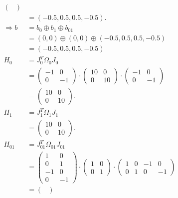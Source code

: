 \begin{align}
\begin{pmatrix}
    \end{pmatrix}\\
    &= (-0.5, 0.5, 0.5, -0.5).\\
    \Rightarrow b &= b_0 \oplus b_1 \oplus b_{01}\\
    &= (0,0) \oplus (0,0) \oplus (-0.5, 0.5, 0.5, -0.5)\\
    &= (-0.5, 0.5, 0.5, -0.5)\\
    H_0 &= J_{0}^T \Omega_0 J_{0}\\
    &= \begin{pmatrix}
           -1 & 0 \\ 0 & -1
    \end{pmatrix} \cdotp \begin{pmatrix}
                             10 & 0 \\ 0 & 10
    \end{pmatrix} \cdotp \begin{pmatrix}
                             -1 & 0 \\ 0 & -1
    \end{pmatrix}\\
    &= \begin{pmatrix}
           10 & 0 \\ 0 & 10
    \end{pmatrix}.\\
    H_1 &= J_{1}^T \Omega_1 J_{1}\\
    &= \begin{pmatrix}
           10 & 0 \\ 0 & 10
    \end{pmatrix}.\\
    H_{01} &= J_{01}^T \Omega_{01} J_{01}\\
    &= \begin{pmatrix}
           1 & 0 \\ 0 & 1 \\ -1 & 0 \\ 0 & -1
    \end{pmatrix} \cdotp \begin{pmatrix}
                             1 & 0 \\ 0 & 1
    \end{pmatrix} \cdotp \begin{pmatrix}
                             1 & 0 & -1 & 0 \\ 0 & 1 & 0 & -1
    \end{pmatrix}\\
    &= \begin{pmatrix}

\end{pmatrix}
\end{align}
